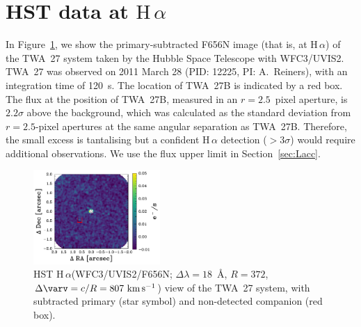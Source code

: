 \documentclass[twocolumn,twocolumnappendix]{aastex631}
\newcommand{\neuI}[1]{{\leavevmode{\boldmath\bfseries#1}}}
\newcommand{\neuII}[1]{{\leavevmode{\boldmath\bfseries#1}}}
\renewcommand{\neuI}[1]{{\leavevmode#1}}
\renewcommand{\neuII}[1]{{\leavevmode#1}}
\def\Ha{\ensuremath{\mathrm{H}\,\alpha}\xspace}             %
\def\Dv{\ensuremath{\Delta \varv}\xspace}
\def\kms{\ensuremath{\textrm{km}\,\textrm{s}^{-1}}\xspace}    %
\def\twb{TWA~27B\xspace}
\begin{document}
%
%
%
%
%


\appendix



%

\section[HST data at Halpha]{HST data at \Ha}
 \label{sec:HSTHa}

%
In Figure~\ref{fig:Ha2D}, we show the primary-subtracted F656N image \neuII{(that is, at \Ha)} of the TWA~27 system taken by the Hubble Space Telescope with WFC3/UVIS2.
TWA~27 was observed on 2011 March 28 (PID: 12225, PI: A.~Reiners), with an integration time of 120~s.
The location of \twb is indicated by a red box.
The flux at the position of \twb, measured in an $r=2.5$~pixel aperture, is $2.2\sigma$ above the background,
which was calculated as the standard deviation from $r=2.5$-pixel apertures at the same angular separation as \twb.
\neuII{Therefore, the small excess is tantalising but} a confident \Ha detection ($>3\sigma$) would require additional observations.
%
We use the flux upper limit in Section~\ref{sec:Lacc}.
%

\begin{figure}[t]
 \centering
 \includegraphics[width=0.43\textwidth]{2M1207b_primary_subtracted_colorbar.pdf}
\caption{%
\neuI{HST \Ha (WFC3/UVIS2/F656N; 
%
$\Delta\lambda=18$~\AA, $R=372$, $\Dv=c/R=807~\kms$)
%
%
%
%
%
view of the TWA~27 system, with subtracted primary (star symbol) and non-detected companion (red box).%
%
}%
}
\label{fig:Ha2D}
\end{figure}





%
%
%
%
%
%
%
%
%
%
%
%
%
%
%
%
%
%
%
%
%

%
%
%

%
%
%
%

%
%
%
%
%
%


%

%
%


%
%
%
%
%
%
%
%
\end{document}
